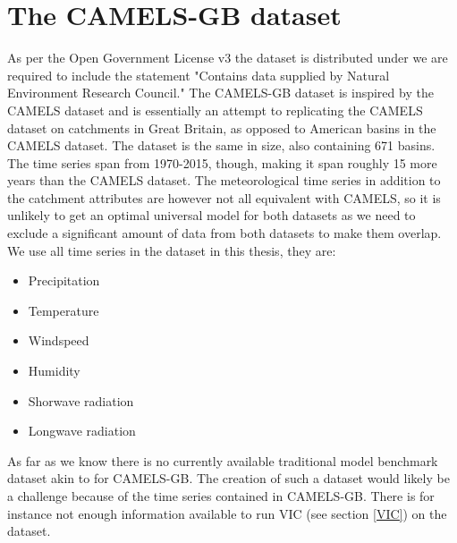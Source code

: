 \section{The CAMELS-GB dataset}
As per the Open Government License v3 the dataset is distributed under we are required 
to include the statement "Contains data supplied by Natural Environment Research Council."
The CAMELS-GB dataset \citep{CAMELS_GB} is inspired by the CAMELS dataset and is 
essentially an attempt to replicating the CAMELS dataset on catchments in Great Britain, 
as opposed to American basins in the CAMELS dataset. The dataset is the same in size,
also containing 671 basins. The time series span from 1970-2015, though, making 
it span roughly 15 more years than the CAMELS dataset.
 The meteorological time series in addition to the catchment attributes are however 
 not all equivalent with CAMELS, so it is unlikely to get an optimal universal model 
 for both datasets as we need to exclude a significant amount of data from both 
 datasets to make them overlap.
We use all time series in the dataset in this thesis, they are:
\begin{itemize}
    \item Precipitation
    \item Temperature
    \item Windspeed
    \item Humidity
    \item Shorwave radiation
    \item Longwave radiation
\end{itemize}


As far as we know there is no currently available traditional model benchmark dataset 
akin to \cite{CAMELS_hydroshare} for CAMELS-GB. The creation of such a dataset would 
likely be a challenge because of the time series contained in CAMELS-GB. There is for 
instance not enough information available to run VIC (see section \ref{VIC}) on 
the dataset.
